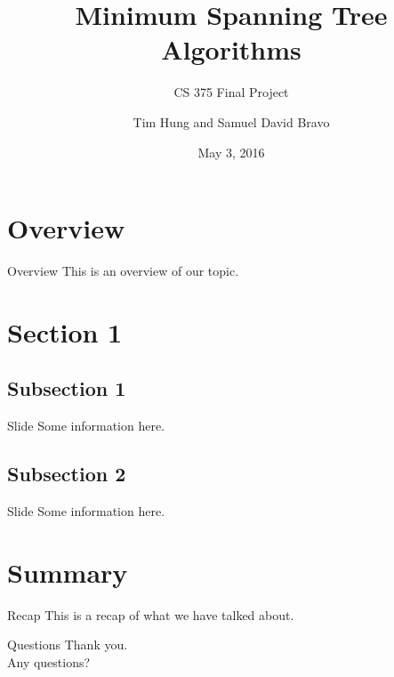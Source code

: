 \documentclass{beamer}
\title{Minimum Spanning Tree Algorithms}
\subtitle{CS 375 Final Project}
\author{Tim Hung and Samuel David Bravo}
\institute{Binghamton University}
\date{May 3, 2016}
\begin{document}
\frame{\titlepage}
\section{Overview}\frame{\sectionpage}
\begin{frame}{Overview}
    This is an overview of our topic.
\end{frame}

\section{Section 1}\frame{\sectionpage}
\subsection{Subsection 1}
\begin{frame}{Slide}
    Some information here.
\end{frame}

\subsection{Subsection 2}
\begin{frame}{Slide}
    Some information here.
\end{frame}

\section{Summary}\frame{\sectionpage}
\begin{frame}{Recap}
    This is a recap of what we have talked about.
\end{frame}

\begin{frame}{Questions}
    Thank you.\\
    Any questions?
\end{frame}
\end{document}
